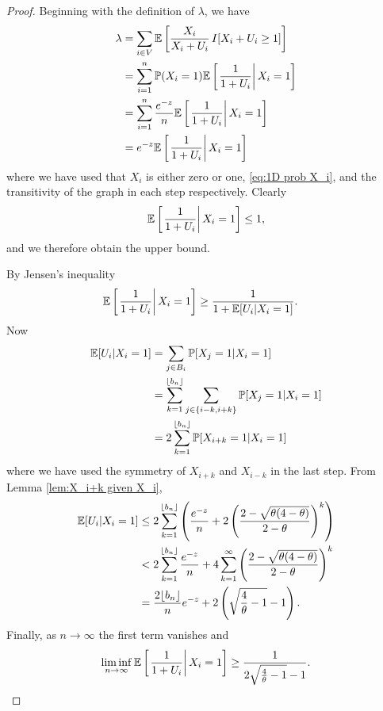 	\begin{proof}
	Beginning with the definition of $\lambda$, we have
		\begin{align}
			\lambda &= \sum_{i \in V} \mathbb{E}\left[\frac{X_i}{X_i + U_i} \, I[ X_i + U_i \geq 1] \right]\\
				&= \sum_{i = 1}^n \mathbb{P}(X_i = 1) \mathbb{E} \left[\left.\frac{1}{1 + U_i}\right| X_i = 1\right]\\
				&= \sum_{i = 1}^n \frac{e^{-z}}{n} \mathbb{E} \left[\left.\frac{1}{1 + U_i}\right| X_i = 1\right]\\
				&= e^{-z} \mathbb{E} \left[\left.\frac{1}{1 + U_i}\right| X_i = 1\right]
		\end{align}
		where we have used that $X_i$ is either zero or one, \eqref{eq:1D prob X_i}, and the transitivity of the graph in each step respectively.
		Clearly 
		\begin{align}
			\mathbb{E} \left[\left.\frac{1}{1 + U_i}\right| X_i = 1\right] \leq 1,
		\end{align}
		and we therefore obtain the upper bound.

		By Jensen's inequality
		\begin{align}
			\expect \left[\left.\frac{1}{1 + U_i}\right| X_i = 1\right] &\geq %
				\frac{1}{1 + \expect[U_i | X_i = 1]}.
		\end{align}
		Now
		\begin{align}
			\mathbb{E}[U_i | X_i = 1] &= \sum_{j \in B_i} \mathbb{P}[X_j = 1| X_i = 1]\\
				&= \sum_{k=1}^{\lfloor b_n\rfloor} \sum_{j \in \{i-k,i+k\}} \mathbb{P}[X_j = 1| X_i = 1]\\
				&= 2 \sum_{k=1}^{\lfloor b_n\rfloor} \mathbb{P}[X_{i+k} = 1 | X_i = 1]
		\end{align}
		where we have used the symmetry of $X_{i+k}$ and $X_{i -k}$ in the last step. From Lemma \ref{lem:X_i+k given X_i}, 
		\begin{align}
			\mathbb{E}[U_i | X_i = 1] &\leq 2 \sum_{k = 1}^{\lfloor b_n\rfloor} \left(\frac{e^{-z}}{n} + 2 \left(\frac{2 - \sqrt{\theta(4 - \theta)}}{2 - \theta}\right)^k\right)\\
				&< 2 \sum_{k = 1}^{\lfloor b_n\rfloor} \frac{e^{-z}}{n} + 4\sum_{k = 1}^\infty \left(\frac{2 - \sqrt{\theta(4 - \theta)}}{2 - \theta}\right)^k\\
				&= \frac{2 \lfloor b_n\rfloor}{n}e^{-z} + 2\left(\sqrt{\frac{4}{\theta} - 1} - 1\right).
		\end{align}
		Finally, as $n \rightarrow \infty$ the first term vanishes and
		\begin{align}
			\liminf_{n \rightarrow \infty} \mathbb{E} \left[\left.\frac{1}{1 + U_i}\right| X_i = 1\right] \geq \frac{1}{2\sqrt{\frac{4}{\theta} - 1} - 1}.
		\end{align}
	\end{proof}

